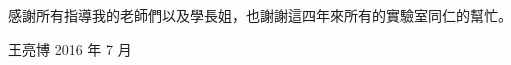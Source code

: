 \begin{acknowledgementszh}
感謝所有指導我的老師們以及學長姐，也謝謝這四年來所有的實驗室同仁的幫忙。

\hspace{1.5em}\hfill 王亮博 2016 年 7 月
\end{acknowledgementszh}

